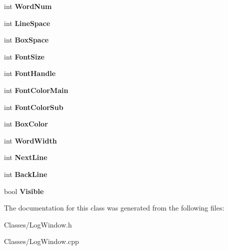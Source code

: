 \begin{DoxyCompactItemize}
\item 
int {\bfseries Word\+Num}\hypertarget{class_c_log_window_a0faa55b1a0e06369a7dc36bc34898632}{}\label{class_c_log_window_a0faa55b1a0e06369a7dc36bc34898632}

\item 
int {\bfseries Line\+Space}\hypertarget{class_c_log_window_a878cbc283249a725d9f437e0c5787865}{}\label{class_c_log_window_a878cbc283249a725d9f437e0c5787865}

\item 
int {\bfseries Box\+Space}\hypertarget{class_c_log_window_a71c20095ebb24561e84b3e1c5389b74f}{}\label{class_c_log_window_a71c20095ebb24561e84b3e1c5389b74f}

\item 
int {\bfseries Font\+Size}\hypertarget{class_c_log_window_a747cd3ed8bdf5c7e6330ada3d4c6d5bf}{}\label{class_c_log_window_a747cd3ed8bdf5c7e6330ada3d4c6d5bf}

\item 
int {\bfseries Font\+Handle}\hypertarget{class_c_log_window_a5ae2447c2563b8a46da2225f45a7276d}{}\label{class_c_log_window_a5ae2447c2563b8a46da2225f45a7276d}

\item 
int {\bfseries Font\+Color\+Main}\hypertarget{class_c_log_window_a18b4391f11e86c99c4e0ae0e3e4c2394}{}\label{class_c_log_window_a18b4391f11e86c99c4e0ae0e3e4c2394}

\item 
int {\bfseries Font\+Color\+Sub}\hypertarget{class_c_log_window_a940601d6766f58c69f098b4c3a65978d}{}\label{class_c_log_window_a940601d6766f58c69f098b4c3a65978d}

\item 
int {\bfseries Box\+Color}\hypertarget{class_c_log_window_a3d122cd2b94fce6a7605d9b939ae47ca}{}\label{class_c_log_window_a3d122cd2b94fce6a7605d9b939ae47ca}

\item 
int {\bfseries Word\+Width}\hypertarget{class_c_log_window_aaf8a0fe5375d196e74b0e248e924c6a6}{}\label{class_c_log_window_aaf8a0fe5375d196e74b0e248e924c6a6}

\item 
int {\bfseries Next\+Line}\hypertarget{class_c_log_window_a33e2679a3f3c571d98860157f325bbda}{}\label{class_c_log_window_a33e2679a3f3c571d98860157f325bbda}

\item 
int {\bfseries Back\+Line}\hypertarget{class_c_log_window_a52511a0c99cac64c2d9097d8fad00937}{}\label{class_c_log_window_a52511a0c99cac64c2d9097d8fad00937}

\item 
bool {\bfseries Visible}\hypertarget{class_c_log_window_afee3508c4ea142dde092560d579c5688}{}\label{class_c_log_window_afee3508c4ea142dde092560d579c5688}

\end{DoxyCompactItemize}


The documentation for this class was generated from the following files\+:\begin{DoxyCompactItemize}
\item 
Classes/Log\+Window.\+h\item 
Classes/Log\+Window.\+cpp\end{DoxyCompactItemize}
